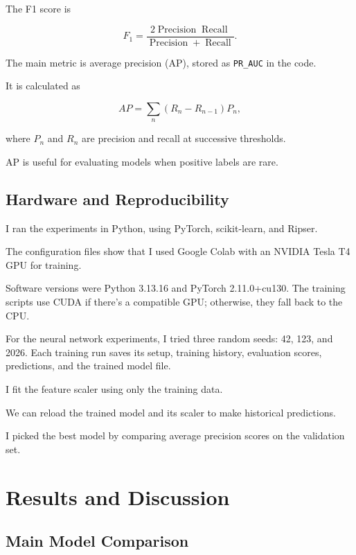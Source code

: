 \documentclass[oneside,english,11pt]{article}
\renewcommand{\boxed}[1]{#1}
\begin{document}
The F1 score is

\begin{equation}
\boxed{
F_1=
\frac{
2\operatorname{Precision}\operatorname{Recall}
}{
\operatorname{Precision}+\operatorname{Recall}
}.
}
\end{equation}

The main metric is average precision (AP),
stored as \texttt{PR\_AUC} in the code.

It is calculated as

\begin{equation}
\boxed{
AP=
\sum_n
(R_n-R_{n-1})P_n,
}
\end{equation}

where $P_n$ and $R_n$ are precision
and recall at successive thresholds.

AP is useful for evaluating models
when positive labels are rare.

\subsection{Hardware and Reproducibility}

I ran the experiments in Python, using PyTorch, scikit-learn, and Ripser.

The configuration files show that I used Google Colab with an NVIDIA Tesla T4 GPU for training.

Software versions were Python 3.13.16 and PyTorch 2.11.0+cu130. The training scripts use CUDA if there’s a compatible GPU; otherwise, they fall back to the CPU.

For the neural network experiments, I tried three random seeds: 42, 123, and 2026. Each training run saves its setup, training history, evaluation scores, predictions, and the trained model file.

I fit the feature scaler using only the training data.

We can reload the trained model and its scaler to make historical predictions.

I picked the best model by comparing average precision scores on the validation set.



\section{Results and Discussion}
\label{sec:results}

\subsection{Main Model Comparison}
\end{document}
